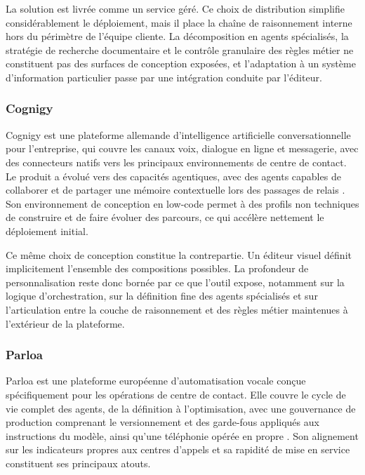 La solution est livrée comme un service géré. Ce choix de distribution simplifie considérablement le déploiement, mais il place la chaîne de raisonnement interne hors du périmètre de l'équipe cliente. La décomposition en agents spécialisés, la stratégie de recherche documentaire et le contrôle granulaire des règles métier ne constituent pas des surfaces de conception exposées, et l'adaptation à un système d'information particulier passe par une intégration conduite par l'éditeur.

\subsubsection{Cognigy}

Cognigy est une plateforme allemande d'intelligence artificielle conversationnelle pour l'entreprise, qui couvre les canaux voix, dialogue en ligne et messagerie, avec des connecteurs natifs vers les principaux environnements de centre de contact. Le produit a évolué vers des capacités agentiques, avec des agents capables de collaborer et de partager une mémoire contextuelle lors des passages de relais \cite{cognigy}. Son environnement de conception en low-code permet à des profils non techniques de construire et de faire évoluer des parcours, ce qui accélère nettement le déploiement initial.

Ce même choix de conception constitue la contrepartie. Un éditeur visuel définit implicitement l'ensemble des compositions possibles. La profondeur de personnalisation reste donc bornée par ce que l'outil expose, notamment sur la logique d'orchestration, sur la définition fine des agents spécialisés et sur l'articulation entre la couche de raisonnement et des règles métier maintenues à l'extérieur de la plateforme.

\subsubsection{Parloa}

Parloa est une plateforme européenne d'automatisation vocale conçue spécifiquement pour les opérations de centre de contact. Elle couvre le cycle de vie complet des agents, de la définition à l'optimisation, avec une gouvernance de production comprenant le versionnement et des garde-fous appliqués aux instructions du modèle, ainsi qu'une téléphonie opérée en propre \cite{parloa}. Son alignement sur les indicateurs propres aux centres d'appels et sa rapidité de mise en service constituent ses principaux atouts.


